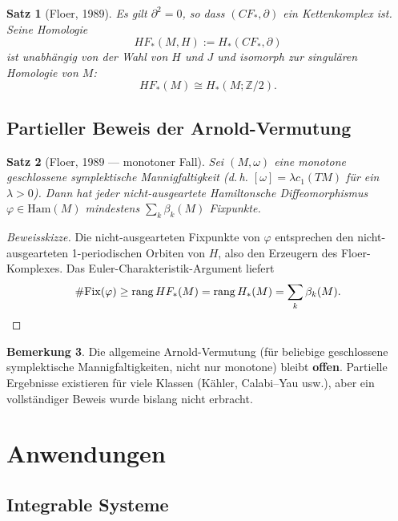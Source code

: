 \documentclass[12pt,a4paper]{amsart}
\newtheorem{theorem}{Satz}[section]
\theoremstyle{definition}
\newtheorem{bemerkung}[theorem]{Bemerkung}
\begin{document}
\begin{theorem}[Floer, 1989]\label{thm:floer}
Es gilt $\partial^2 = 0$, so dass $(CF_*, \partial)$ ein Kettenkomplex ist.
Seine Homologie
\[
  HF_*(M, H) := H_*(CF_*, \partial)
\]
ist unabhängig von der Wahl von $H$ und $J$ und isomorph zur singulären
Homologie von $M$:
\[
  HF_*(M) \cong H_*(M; \mathbb{Z}/2).
\]
\end{theorem}

\subsection{Partieller Beweis der Arnold-Vermutung}

\begin{theorem}[Floer, 1989 — monotoner Fall]\label{thm:arnold_floer}
Sei $(M, \omega)$ eine monotone geschlossene symplektische Mannigfaltigkeit
(d.\,h. $[\omega] = \lambda c_1(TM)$ für ein $\lambda > 0$).  Dann hat jeder
nicht-ausgeartete Hamiltonsche Diffeomorphismus $\varphi \in \mathrm{Ham}(M)$
mindestens $\sum_k \beta_k(M)$ Fixpunkte.
\end{theorem}

\begin{proof}[Beweisskizze]
Die nicht-ausgearteten Fixpunkte von $\varphi$ entsprechen den
nicht-ausgearteten 1-periodischen Orbiten von $H$, also den Erzeugern des
Floer-Komplexes.  Das Euler-Charakteristik-Argument liefert
\[
  \#\mathrm{Fix}(\varphi) \geq \mathrm{rang}\, HF_*(M) = \mathrm{rang}\, H_*(M)
  = \sum_k \beta_k(M).  \qedhere
\]
\end{proof}

\begin{bemerkung}
Die allgemeine Arnold-Vermutung (für beliebige geschlossene symplektische
Mannigfaltigkeiten, nicht nur monotone) bleibt \textbf{offen}.  Partielle
Ergebnisse existieren für viele Klassen (Kähler, Calabi--Yau usw.), aber ein
vollständiger Beweis wurde bislang nicht erbracht.
\end{bemerkung}

\section{Anwendungen}
\label{sec:anwendungen}

\subsection{Integrable Systeme}
\end{document}
